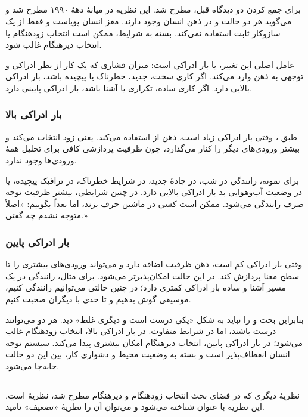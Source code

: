\subsection{}
برای جمع کردن دو دیدگاه قبل،  مطرح شد. این نظریه در میانهٔ دههٔ ۱۹۹۰ مطرح شد و می‌گوید هر دو حالت  و  در ذهن انسان وجود دارند. مغز انسان پویاست و فقط از یک سازوکار ثابت استفاده نمی‌کند. بسته به شرایط، ممکن است انتخاب زودهنگام یا انتخاب دیرهنگام غالب شود.

عامل اصلی این تغییر،  یا بار ادراکی است: میزان فشاری که یک کار از نظر ادراکی و توجهی به ذهن وارد می‌کند. اگر کاری سخت، جدید، خطرناک یا پیچیده باشد، بار ادراکی بالایی دارد. اگر کاری ساده، تکراری یا آشنا باشد، بار ادراکی پایینی دارد.

\subsubsection{بار ادراکی بالا}
طبق ، وقتی بار ادراکی زیاد است، ذهن از  استفاده می‌کند. یعنی زود انتخاب می‌کند و بیشتر ورودی‌های دیگر را کنار می‌گذارد، چون ظرفیت پردازشی کافی برای تحلیل همهٔ ورودی‌ها وجود ندارد.

برای نمونه، رانندگی در شب، در جادهٔ جدید، در شرایط خطرناک، در ترافیک پیچیده، یا در وضعیت آب‌وهوایی بد بار ادراکی بالایی دارد. در چنین شرایطی، بیشتر ظرفیت توجه صرف رانندگی می‌شود. ممکن است کسی در ماشین حرف بزند، اما بعداً بگوییم: «اصلاً متوجه نشدم چه گفتی.»

\subsubsection{بار ادراکی پایین}
وقتی بار ادراکی کم است، ذهن ظرفیت اضافه دارد و می‌تواند ورودی‌های بیشتری را تا سطح معنا پردازش کند. در این حالت  امکان‌پذیرتر می‌شود. برای مثال، رانندگی در یک مسیر آشنا و ساده بار ادراکی کمتری دارد؛ در چنین حالتی می‌توانیم رانندگی کنیم، موسیقی گوش بدهیم و تا حدی با دیگران صحبت کنیم.

بنابراین بحث  و  را نباید به شکل «یکی درست است و دیگری غلط» دید. هر دو می‌توانند درست باشند، اما در شرایط متفاوت. در بار ادراکی بالا، انتخاب زودهنگام غالب می‌شود؛ در بار ادراکی پایین، انتخاب دیرهنگام امکان بیشتری پیدا می‌کند. سیستم توجه انسان انعطاف‌پذیر است و بسته به وضعیت محیط و دشواری کار، بین این دو حالت جابه‌جا می‌شود.

\subsection{}
نظریهٔ دیگری که در فضای بحث انتخاب زودهنگام و دیرهنگام مطرح شد، نظریهٔ  است. این نظریه با عنوان  شناخته می‌شود و می‌توان آن را نظریهٔ «تضعیف» نامید.

